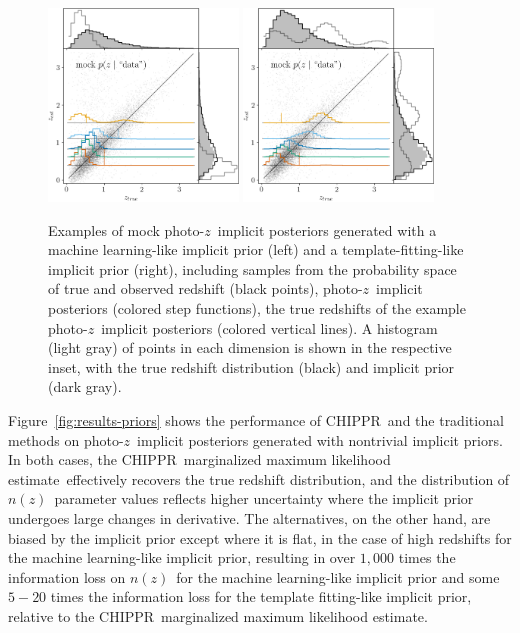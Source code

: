 \documentclass[iop]{emulateapj}
\newcommand{\todo}[3]{{\color{#2}\emph{#1}: #3}}
\newcommand{\aim}[1]{\todo{AIM}{red}{#1}}
\newcommand{\Fig}[1]{Figure~\ref{#1}}
\newcommand{\project}[1]{\textsc{#1}}
\newcommand{\Chippr}{\project{CHIPPR}}%
\newcommand{\pz}{photo-$z$}
\newcommand{\pzip}{\pz\ implicit posterior}
\newcommand{\nz}{$n(z)$}
\newcommand{\mmle}{marginalized maximum likelihood estimate}%
\begin{document}
\begin{figure}
	\begin{center}
		\includegraphics[width=0.45\textwidth]{figures/chippr/single_lsst_trpr-mega_scatter.png}
		\includegraphics[width=0.45\textwidth]{figures/chippr/single_lsst_tmpr-mega_scatter.png}
		\caption{
			Examples of mock \pzip s generated with a machine learning-like implicit prior (left) and a template-fitting-like implicit prior (right), including samples from the probability space of true and observed redshift (black points), \pzip s (colored step functions), the true redshifts of the example \pzip s (colored vertical lines).
			A histogram (light gray) of points in each dimension is shown in the respective inset, with the true redshift distribution (black) and implicit prior (dark gray).
		}
		\label{fig:pzs-priors}
	\end{center}
\end{figure}

\Fig{fig:results-priors} shows the performance of \Chippr\ and the traditional methods on \pzip s generated with nontrivial implicit priors.
In both cases, the \Chippr\ \mmle\ effectively recovers the true redshift distribution, and the distribution of \nz\ parameter values reflects higher uncertainty where the implicit prior undergoes large changes in derivative.
The alternatives, on the other hand, are biased by the implicit prior except where it is flat, in the case of high redshifts for the machine learning-like implicit prior, resulting in over $1,000$ times the information loss on \nz\ for the machine learning-like implicit prior and some $5-20$ times the information loss for the template fitting-like implicit prior, relative to the \Chippr\ \mmle.
\end{document}
